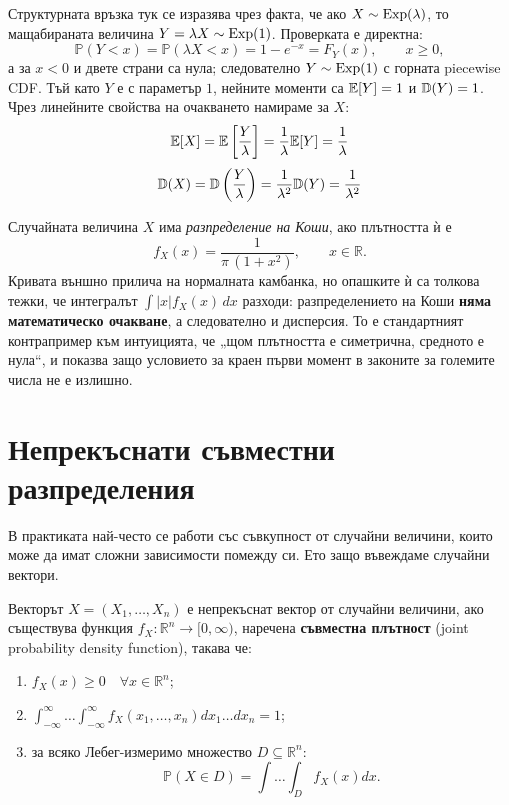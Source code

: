 Структурната връзка тук се изразява чрез факта, че ако $X \sim \operatorname{Exp}(\lambda)$, то мащабираната величина $Y = \lambda X \sim \operatorname{Exp}(1)$. Проверката е директна:
\[
\mathbb{P}(Y < x) = \mathbb{P}(\lambda X < x) = 1-e^{-x}=F_Y(x),\qquad x\ge0,
\]
а за $x<0$ и двете страни са нула; следователно $Y\sim\operatorname{Exp}(1)$ с горната piecewise CDF.
Тъй като $Y$ е с параметър $1$, нейните моменти са $\mathbb{E}[Y] = 1$ и $\mathbb{D}(Y) = 1$. Чрез линейните свойства на очакването намираме за $X$:
\[
\mathbb{E}[X] = \mathbb{E}\left[\frac{Y}{\lambda}\right] = \frac{1}{\lambda}\mathbb{E}[Y] = \frac{1}{\lambda}
\]
\[
\mathbb{D}(X) = \mathbb{D}\left(\frac{Y}{\lambda}\right) = \frac{1}{\lambda^2}\mathbb{D}(Y) = \frac{1}{\lambda^2}
\]

\begin{supp}\label{supp:cauchy}
Случайната величина $X$ има \emph{разпределение на Коши}, ако плътността ѝ е
\[ f_X(x) = \frac{1}{\pi\,(1+x^2)}, \qquad x \in \mathbb{R} . \]
Кривата външно прилича на нормалната камбанка, но опашките ѝ са толкова тежки, че
интегралът $\int |x| f_X(x)\,dx$ разходи: разпределението на Коши \textbf{няма
математическо очакване}, а следователно и дисперсия. То е стандартният
контрапример към интуицията, че „щом плътността е симетрична, средното е нула“,
и показва защо условието за краен първи момент в законите за големите числа не е
излишно.
\end{supp}

\section{Непрекъснати съвместни разпределения}

В практиката най-често се работи със съвкупност от случайни величини, които може да имат сложни зависимости помежду си. Ето защо въвеждаме случайни вектори.

\begin{defn}
Векторът $X = (X_1, \dots, X_n)$ е непрекъснат вектор от случайни величини, ако съществува функция $f_X: \mathbb{R}^n \to [0, \infty)$, наречена \textbf{съвместна плътност} (joint probability density function), такава че:
\begin{enumerate}
    \item $f_X(x) \ge 0 \quad \forall x \in \mathbb{R}^n$;
    \item $\int_{-\infty}^{\infty} \dots \int_{-\infty}^{\infty} f_X(x_1, \dots, x_n) dx_1 \dots dx_n = 1$;
    \item за всяко Лебег-измеримо множество $D \subseteq \mathbb{R}^n$:
    \[
    \mathbb{P}(X \in D) = \int \dots \int_D f_X(x) dx .
    \]
\end{enumerate}
\end{defn}

